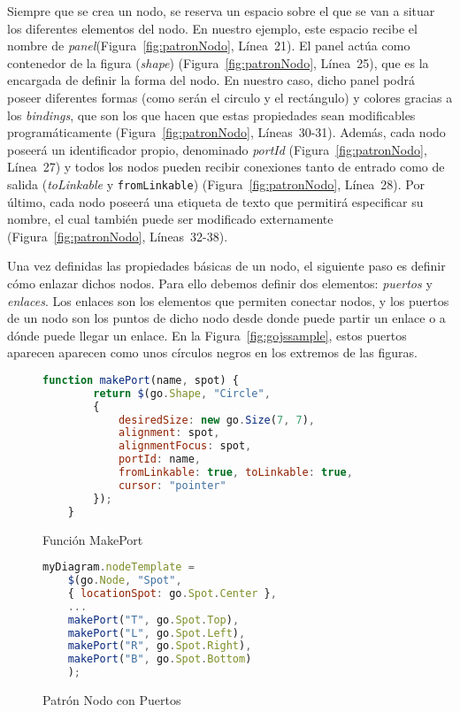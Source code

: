 Siempre que se crea un nodo, se reserva un espacio sobre el que se van a situar los diferentes elementos del nodo. En nuestro ejemplo, este espacio recibe el nombre de \emph{panel}(Figura~\ref{fig:patronNodo}, Línea~21). El panel actúa como contenedor de la figura (\emph{shape}) (Figura~\ref{fig:patronNodo}, Línea~25), que es la encargada de definir la forma del nodo. En nuestro caso, dicho panel podrá poseer diferentes formas (como serán el circulo y el rectángulo) y colores gracias a los \emph{bindings}, que son los que hacen que estas propiedades sean modificables programáticamente (Figura~\ref{fig:patronNodo}, Líneas~30-31). Además, cada nodo poseerá un identificador propio, denominado \emph{portId} (Figura~\ref{fig:patronNodo}, Línea~27) y todos los nodos pueden recibir conexiones tanto de entrado como de salida (\emph{toLinkable} y \texttt{fromLinkable}) (Figura~\ref{fig:patronNodo}, Línea~28). Por último, cada nodo poseerá una etiqueta de texto que permitirá especificar su nombre, el cual también puede ser modificado externamente (Figura~\ref{fig:patronNodo}, Líneas~32-38).

Una vez definidas las propiedades básicas de un nodo, el siguiente paso es definir cómo enlazar dichos nodos. Para ello debemos definir dos elementos: \emph{puertos} y \emph{enlaces}. Los enlaces son los elementos que permiten conectar nodos, y los puertos de un nodo son los puntos de dicho nodo desde donde puede partir un enlace o a dónde puede llegar un enlace.  En la Figura~\ref{fig:gojssample}, estos puertos aparecen aparecen como unos círculos negros en los extremos de las figuras.

\begin{figure}[H]
	\centering
	\begin{lstlisting}[language=JavaScript]
	function makePort(name, spot) {
		return $(go.Shape, "Circle",
		{
			desiredSize: new go.Size(7, 7),
			alignment: spot,
			alignmentFocus: spot,
			portId: name,
			fromLinkable: true, toLinkable: true,
			cursor: "pointer"
		});
	}\end{lstlisting}
	\caption{Función MakePort}
	\label{fig:funcionMakeport}
\end{figure}

\begin{figure}[H]
	\centering
	\begin{lstlisting}[language=JavaScript]
	myDiagram.nodeTemplate =
	$(go.Node, "Spot",
	{ locationSpot: go.Spot.Center },
	...
	makePort("T", go.Spot.Top),
	makePort("L", go.Spot.Left),
	makePort("R", go.Spot.Right),
	makePort("B", go.Spot.Bottom)
	);\end{lstlisting}
	\caption{Patrón Nodo con Puertos}
	\label{fig:patronNodoFinal}
\end{figure}

